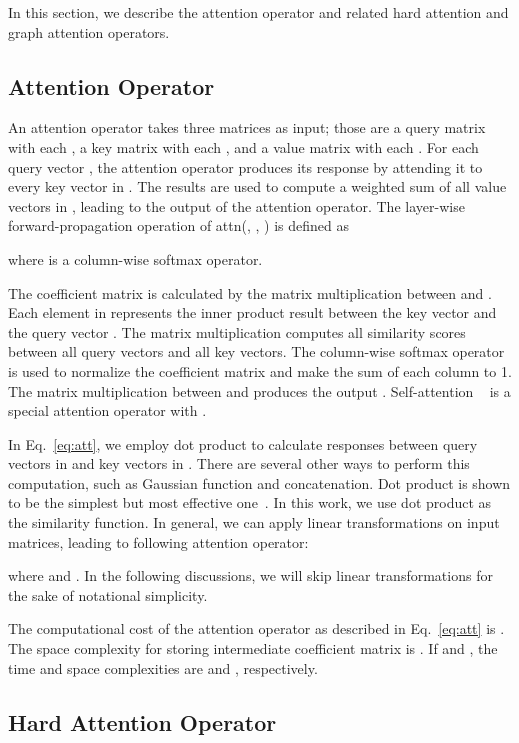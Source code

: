 \documentclass[sigconf]{acmart}
\begin{document}
In this section, we describe the attention operator and related hard
attention and graph attention operators.

\subsection{Attention Operator}\label{sec:att}

An attention operator takes three matrices as input; those are a query matrix
 with each , a key
matrix  with each , and a value matrix  with each
. For each query vector ,
the attention operator produces its response by attending it to every key vector
in . The results are used to compute a weighted sum of all value
vectors in , leading to the output of the attention operator.
The layer-wise forward-propagation operation of attn(, ,
) is defined as

where  is a column-wise softmax operator.

The coefficient matrix  is calculated by the matrix
multiplication between  and . Each
element  in  represents the inner product
result between the key vector  and the query
vector . The matrix multiplication  computes all similarity scores between all query
vectors and all key vectors. The column-wise softmax operator is
used to normalize the coefficient matrix and make the sum of each
column to 1. The matrix multiplication between  and
 produces the output .
Self-attention ~\cite{vaswani2017attention} is a special attention
operator with .

In Eq.~\ref{eq:att}, we employ dot product to calculate responses
between query vectors in  and key vectors in
. There are several other ways to perform this
computation, such as Gaussian function and concatenation. Dot
product is shown to be the simplest but most effective
one~\cite{wang2018non}. In this work, we use dot product as the
similarity function. In general, we can apply linear transformations
on input matrices, leading to following attention operator:

where   and . In the following discussions, we will
skip linear transformations for the sake of notational simplicity.

The computational cost of the attention operator as described in
Eq.~\ref{eq:att} is . The space complexity for storing
intermediate coefficient matrix  is .
If  and , the time and space complexities are
 and , respectively.

\subsection{Hard Attention Operator}
\end{document}
